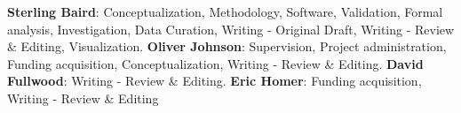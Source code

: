 \textbf{Sterling Baird}: Conceptualization, Methodology, Software, Validation, Formal analysis, Investigation, Data Curation, Writing - Original Draft, Writing - Review \& Editing, Visualization. \textbf{Oliver Johnson}: Supervision, Project administration, Funding acquisition, Conceptualization, Writing - Review \& Editing. \textbf{David Fullwood}: Writing - Review \& Editing. \textbf{Eric Homer}: Funding acquisition, Writing - Review \& Editing

